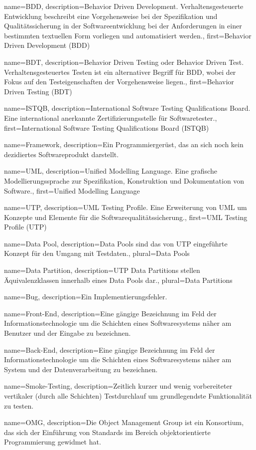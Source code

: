  {
	name={BDD},
	description={Behavior Driven Development. Verhaltensgesteuerte Entwicklung beschreibt eine Vorgehensweise bei der Spezifikation und Qualitätssicherung in der Softwareentwicklung bei der Anforderungen in einer bestimmten textuellen Form vorliegen und automatisiert werden.},
	first={Behavior Driven Development (BDD)}
}

 {
	name={BDT},
	description={Behavior Driven Testing oder Behavior Driven Test. Verhaltensgesteuertes Testen ist ein alternativer Begriff für BDD, wobei der Fokus auf den Testeigenschaften der Vorgehensweise liegen.},
	first={Behavior Driven Testing (BDT)}
}

 {
	name={ISTQB},
	description={International Software Testing Qualifications Board. Eine international anerkannte Zertifizierungsstelle für Softwaretester.},
	first={International Software Testing Qualifications Board (ISTQB)}
}

 {
	name={Framework},
	description={Ein Programmiergerüst, das an sich noch kein dezidiertes Softwareprodukt darstellt.}
}

 {
	name={UML},
	description={Unified Modelling Language. Eine grafische Modellierungssprache zur Spezifikation, Konstruktion und Dokumentation von Software.},
	first={Unified Modelling Language}
}

 {
	name={UTP},
	description={UML Testing Profile. Eine Erweiterung von UML um Konzepte und Elemente für die Softwarequalitätssicherung.},
	first={UML Testing Profile (UTP)}
}

 {
	name={Data Pool},
	description={Data Pools sind das von UTP eingeführte Konzept für den Umgang mit Testdaten.},
	plural={Data Pools}
}

 {
	name={Data Partition},
	description={UTP Data Partitions stellen Äquivalenzklassen innerhalb eines Data Pools dar.},
	plural={Data Partitions}
}

 {
	name={Bug},
	description={Ein Implementierungsfehler.}
}

 {
	name={Front-End},
	description={Eine gängige Bezeichnung im Feld der Informationstechnologie um die Schichten eines Softwaresystems näher am Benutzer und der Eingabe zu bezeichnen.}
}

 {
	name={Back-End},
	description={Eine gängige Bezeichnung im Feld der Informationstechnologie um die Schichten eines Softwaresystems näher am System und der Datenverarbeitung zu bezeichnen.}
}


 {
	name={Smoke-Testing},
	description={Zeitlich kurzer und wenig vorbereiteter vertikaler (durch alle Schichten) Testdurchlauf um grundlegendste Funktionalität zu testen.}
}

 {
	name={OMG},
	description={Die Object Management Group ist ein Konsortium, das sich der Einführung von Standards im Bereich objektorientierte Programmierung gewidmet hat.}
}
